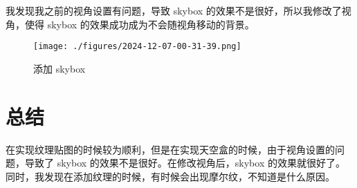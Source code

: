 \documentclass[12pt,hyperref,a4paper,UTF8]{ctexart}
\begin{document}
我发现我之前的视角设置有问题，导致 skybox 的效果不是很好，所以我修改了视角，使得 skybox 的效果成功成为不会随视角移动的背景。

\begin{figure}[H]
    \centering
    \texttt{[image: ./figures/2024-12-07-00-31-39.png]}
    \caption{添加 skybox}   
\end{figure}

\section{总结}
在实现纹理贴图的时候较为顺利，但是在实现天空盒的时候，由于视角设置的问题，导致了 skybox 的效果不是很好。在修改视角后，skybox 的效果就很好了。同时，我发现在添加纹理的时候，有时候会出现摩尔纹，不知道是什么原因。
\end{document}
